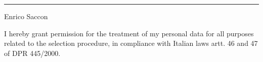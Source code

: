 \documentclass[10pt,a4paper,sans]{moderncv} %
\begin{document}
\vspace*{\fill}
    \begin{flushright}
      \begin{minipage}{.4\paperwidth}
        \centering
        \noindent\rule{.4\paperwidth}{0.4pt}
        \vspace{1em}
        Enrico Saccon
      \end{minipage}
    \end{flushright}




    \noindent\makebox[\linewidth]{\rule{.9\paperwidth}{0.4pt}}
    {\center\footnotesize
        I hereby grant permission for the treatment of my personal data for all purposes related to the selection procedure, in compliance with Italian laws artt. 46 and 47 of DPR 445/2000.
    }

\lfoot{\today}
\thispagestyle{fancy}
\end{document}
